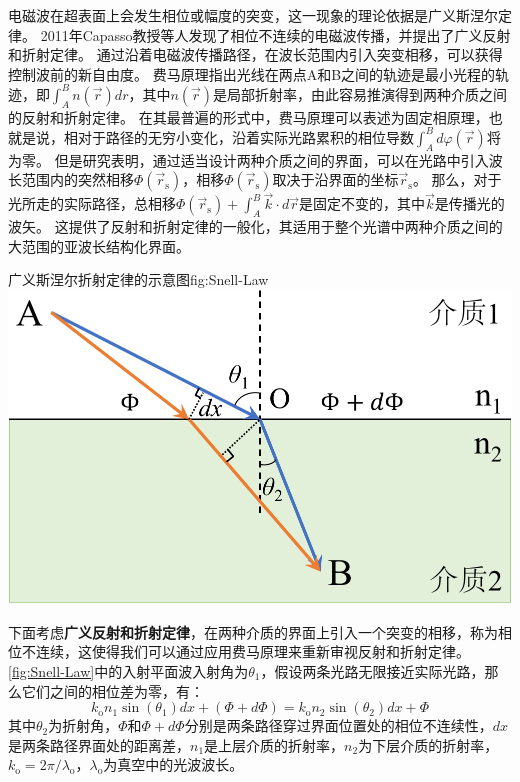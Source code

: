 \documentclass[supercite]{HustGraduPaper}
\begin{document}
电磁波在超表面上会发生相位或幅度的突变，这一现象的理论依据是广义斯涅尔定律\cite{9326394}。
2011年Capasso教授等人发现了相位不连续的电磁波传播，并提出了广义反射和折射定律\cite{yu2011light}。
通过沿着电磁波传播路径，在波长范围内引入突变相移，可以获得控制波前的新自由度。
费马原理指出光线在两点A和B之间的轨迹是最小光程的轨迹，即$ \int_{A}^{B} n(\vec{r}) dr $，其中$ n(\vec{r}) $是局部折射率，由此容易推演得到两种介质之间的反射和折射定律。
在其最普遍的形式中，费马原理可以表述为固定相原理\cite{feynman2010quantum}，也就是说，相对于路径的无穷小变化，沿着实际光路累积的相位导数$ \int_{A}^{B} d \varphi (\vec{r}) $将为零。
但是研究表明，通过适当设计两种介质之间的界面，可以在光路中引入波长范围内的突然相移$ \Phi (\vec{r}_\mathrm{s}) $，相移$ \Phi (\vec{r}_\mathrm{s}) $取决于沿界面的坐标$ \vec{r}_\mathrm{s} $。
那么，对于光所走的实际路径，总相移$ \Phi\left(\vec{r}_{\mathrm{s}}\right)+\int_{A}^{B} \vec{k} \cdot d \vec{r} $是固定不变的，其中$ \vec{k} $是传播光的波矢。
这提供了反射和折射定律的一般化，其适用于整个光谱中两种介质之间的大范围的亚波长结构化界面。

\begin{generalfig}[htb]{广义斯涅尔折射定律的示意图}{fig:Snell-Law}
	\includegraphics[width=0.5\linewidth]{Figures/Snell-Law.pdf}
\end{generalfig}

下面考虑{\bfseries 广义反射和折射定律}，在两种介质的界面上引入一个突变的相移，称为相位不连续，这使得我们可以通过应用费马原理来重新审视反射和折射定律。
\autoref{fig:Snell-Law}中的入射平面波入射角为$\theta_1$，假设两条光路无限接近实际光路，那么它们之间的相位差为零，有：
\begin{equation}
	k_\mathrm{o} n_1 \sin (\theta_1) dx + (\Phi + d\Phi) = k_\mathrm{o} n_2 \sin (\theta_2) dx + \Phi
	\label{eq:Generalized-snell-law-pre}
\end{equation}
其中$ \theta_2 $为折射角，$ \Phi $和$ \Phi + d\Phi $分别是两条路径穿过界面位置处的相位不连续性，$ dx $是两条路径界面处的距离差，$n_1$是上层介质的折射率，$n_2$为下层介质的折射率，$k_\mathrm{o}=2 \pi / \lambda_\mathrm{o}$，$\lambda_\mathrm{o}$为真空中的光波波长。
\end{document}
